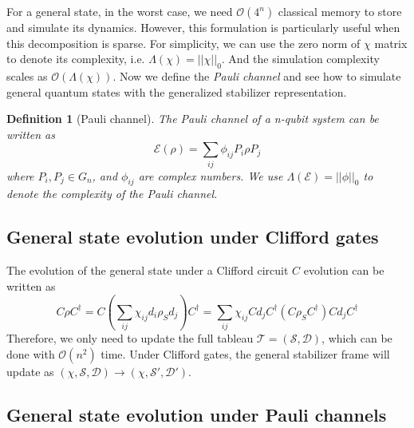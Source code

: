 \documentclass[a4paper,accepted=2024-07-10]{quantumarticle}
\newtheorem{definition}{Definition}[section]
\newcommand{\scD}{\mathcal{D}}
\newcommand{\scE}{\mathcal{E}}
\newcommand{\scO}{\mathcal{O}}
\newcommand{\scT}{\mathcal{T}}
\newcommand{\scS}{\mathcal{S}}
\begin{document}
For a general state, in the worst case, we need $\scO(4^n)$ classical memory to store and simulate its dynamics. However, this formulation is particularly useful when this decomposition is sparse. For simplicity, we can use the zero norm of $\chi$ matrix to denote its complexity, i.e. $\Lambda(\chi)=||\chi||_0$. And the simulation complexity scales as $\mathcal{O}(\Lambda(\chi))$. Now we define the \emph{Pauli channel} and see how to simulate general quantum states with the generalized stabilizer representation.
\begin{definition}[Pauli channel]
    The Pauli channel of a n-qubit system can be written as 
    \begin{equation}
        \scE(\rho)=\sum_{ij}\phi_{ij}P_i \rho P_j
    \end{equation}
    where $P_i,P_j\in G_n$, and $\phi_{ij}$ are complex numbers. We use $\Lambda(\scE)=||\phi||_0$ to denote the complexity of the Pauli channel.
\end{definition}
\subsection{General state evolution under Clifford gates}
The evolution of the general state under a Clifford circuit $C$ evolution can be written as
\begin{equation}
    C \rho C^{\dagger} = C\left(\sum_{ij}\chi_{ij}d_i \rho_S d_j\right)C^{\dagger} = \sum_{ij}\chi_{ij}C d_j C^{\dagger}\left(C \rho_S C^{\dagger}\right)C d_j C^{\dagger}
\end{equation}
Therefore, we only need to update the full tableau $\scT=(\scS,\scD)$, which can be done with $\scO(n^2)$ time. Under Clifford gates, the general stabilizer frame will update as $(\chi,\scS,\scD)\rightarrow(\chi,\scS',\scD')$.

\subsection{General state evolution under Pauli channels}
\end{document}
